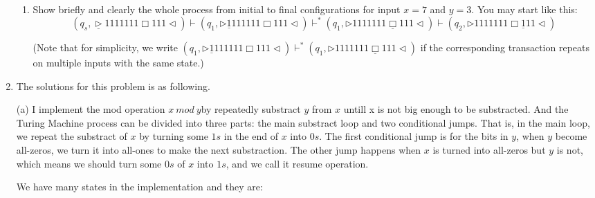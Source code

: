 \documentclass[12pt,a4paper]{article}
\makeatletter
\newtheorem*{solution}{Solution}
\theoremstyle{definition}
\renewenvironment{solution}[1][Solution] {\par\pushQED{\qed}\normalfont\topsep6\p@\@plus6\p@\relax\trivlist\item[\hskip\labelsep\bfseries#1\@addpunct{.}]\ignorespaces}{\popQED\endtrivlist\@endpefalse} \makeatother
\makeatother
\begin{document}
\begin{enumerate}
\begin{enumerate}
	\item
	Show briefly and clearly the whole process from initial to final configurations for input $x = 7$ and $y = 3$. You may start like this:
	$$(q_s,\underline{\triangleright}  1  1  1  1  1  1  1  \Box 1  1  1   \triangleleft)
	\vdash (q_1,\triangleright  \underline{1}  1  1  1  1  1  1  \Box 1  1  1   \triangleleft)
	\vdash^* (q_1,\triangleright  1  1  1  1  1  1  1  \underline{\Box} 1  1  1   \triangleleft)
	\vdash (q_2,\triangleright  1  1  1  1  1  1  1  \Box \underline{1}  1  1   \triangleleft)$$
	
	\par{\color{blue}(Note that for simplicity, we write $(q_1,\triangleright  \underline{1}  1  1  1  1  1  1  \Box 1  1  1   \triangleleft)\vdash^* (q_1,\triangleright  1  1  1  1  1  1  1  \underline{\Box} 1  1  1   \triangleleft)$ if the corresponding transaction repeats on multiple inputs with the same state.)}
	
\end{enumerate}



\begin{solution}
The solutions for this problem is as following.

(a) I implement the mod operation  $x~mod ~y$by repeatedly substract $y$ from $x$ untill x is not big enough to be substracted.
And the Turing Machine process can be divided into three parts: the main substract loop and two conditional jumps.
That is, in the main loop, we repeat the substract of $x$ by turning some $1s$ in the end of $x$ into $0s$.
The first conditional jump is for the bits in $y$, when $y$ become all-zeros, we turn it into all-ones to make the next substraction. The other jump happens when $x$ is turned into all-zeros
but $y$ is not, which means we should turn  some $0s$ of $x$ into $1s$, and we call it resume operation.

We have many states in the implementation and they are:



\end{solution}
\end{enumerate}
\end{document}
